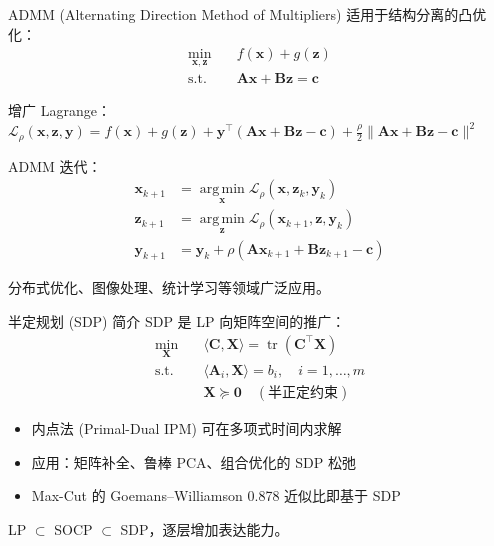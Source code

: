 \documentclass[11pt, aspectratio=169, svgnames, table, fontset=fandol]{ctexbeamer}
\newcommand{\argmin}{\operatorname*{arg\,min}}
\newcommand{\tr}{\operatorname{tr}}
\begin{document}
\begin{frame}{ADMM (Alternating Direction Method of Multipliers)}
  适用于结构分离的凸优化：
  \begin{align*}
    \min_{\bm{x}, \bm{z}} \quad & f(\bm{x}) + g(\bm{z}) \\
    \text{s.t.} \quad           & \bm{Ax} + \bm{Bz} = \bm{c}
  \end{align*}

  \vspace{4pt}
  增广 Lagrange：$\mathcal{L}_\rho(\bm{x}, \bm{z}, \bm{y}) = f(\bm{x}) + g(\bm{z}) + \bm{y}^\top(\bm{Ax} + \bm{Bz} - \bm{c}) + \frac{\rho}{2}\|\bm{Ax} + \bm{Bz} - \bm{c}\|^2$

  \vspace{4pt}
  ADMM 迭代：
  \begin{align*}
    \bm{x}_{k+1} &= \argmin_{\bm{x}} \mathcal{L}_\rho(\bm{x}, \bm{z}_k, \bm{y}_k) \\
    \bm{z}_{k+1} &= \argmin_{\bm{z}} \mathcal{L}_\rho(\bm{x}_{k+1}, \bm{z}, \bm{y}_k) \\
    \bm{y}_{k+1} &= \bm{y}_k + \rho(\bm{Ax}_{k+1} + \bm{Bz}_{k+1} - \bm{c})
  \end{align*}

  分布式优化、图像处理、统计学习等领域广泛应用。
\end{frame}

\begin{frame}{半定规划 (SDP) 简介}
  SDP 是 LP 向矩阵空间的推广：
  \begin{align*}
    \min_{\bm{X}} \quad & \langle \bm{C}, \bm{X} \rangle = \tr(\bm{C}^\top \bm{X}) \\
    \text{s.t.} \quad   & \langle \bm{A}_i, \bm{X} \rangle = b_i,\quad i=1,\dots,m \\
                        & \bm{X} \succcurlyeq \bm{0} \quad (\text{半正定约束})
  \end{align*}

  \begin{itemize}
    \item 内点法 (Primal-Dual IPM) 可在多项式时间内求解
    \item 应用：矩阵补全、鲁棒 PCA、组合优化的 SDP 松弛
    \item Max-Cut 的 Goemans–Williamson 0.878 近似比即基于 SDP
  \end{itemize}

  LP $\subset$ SOCP $\subset$ SDP，逐层增加表达能力。
\end{frame}
\end{document}
